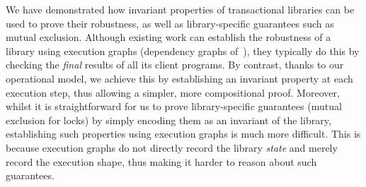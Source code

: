 We have demonstrated how invariant properties of transactional libraries can be used to prove their robustness, as well as  library-specific guarantees such as mutual exclusion. 
Although existing work can establish the robustness of a library using execution graphs (\eg dependency graphs of~\cite{adya}), they typically do this by checking the \emph{final} results of all its client programs.
By contrast, thanks to our operational model, we achieve this by establishing an invariant property at each execution step, thus allowing a simpler, more compositional proof. 
Moreover, whilst it is straightforward for us to prove library-specific guarantees (\eg mutual exclusion for locks) by simply encoding them as an invariant of the library, 
establishing such properties using execution graphs is much more difficult.
This is because execution graphs do not directly record the library \emph{state} and merely record the execution shape, thus making it harder to reason about such guarantees.
